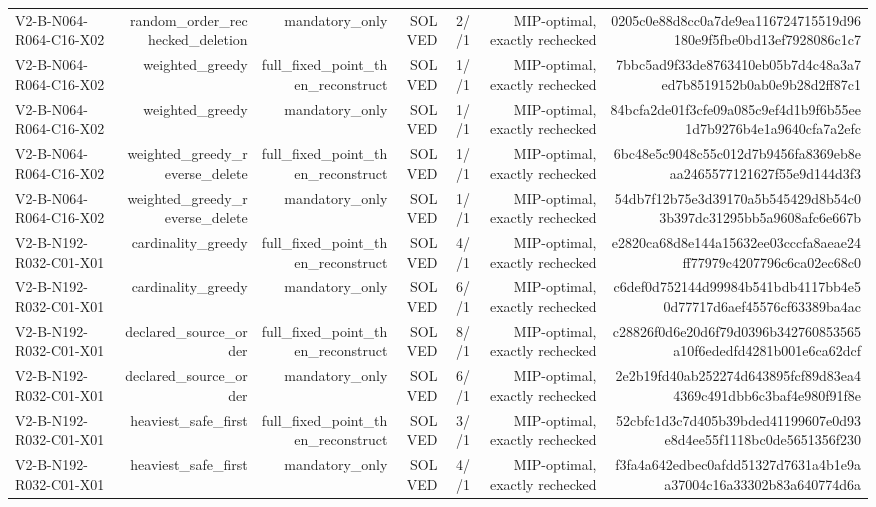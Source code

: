 {\begin{longtable}{lrrrrrr}
V2-B-N064-R064-C16-X02 & random\_order\_rechecked\_deletion & mandatory\_only & SOLVED & 2//1 & MIP-optimal, exactly rechecked & 0205c0e88d8cc0a7de9ea116724715519d96180e9f5fbe0bd13ef7928086c1c7 \\
V2-B-N064-R064-C16-X02 & weighted\_greedy & full\_fixed\_point\_then\_reconstruct & SOLVED & 1//1 & MIP-optimal, exactly rechecked & 7bbc5ad9f33de8763410eb05b7d4c48a3a7ed7b8519152b0ab0e9b28d2ff87c1 \\
V2-B-N064-R064-C16-X02 & weighted\_greedy & mandatory\_only & SOLVED & 1//1 & MIP-optimal, exactly rechecked & 84bcfa2de01f3cfe09a085c9ef4d1b9f6b55ee1d7b9276b4e1a9640cfa7a2efc \\
V2-B-N064-R064-C16-X02 & weighted\_greedy\_reverse\_delete & full\_fixed\_point\_then\_reconstruct & SOLVED & 1//1 & MIP-optimal, exactly rechecked & 6bc48e5c9048c55c012d7b9456fa8369eb8eaa2465577121627f55e9d144d3f3 \\
V2-B-N064-R064-C16-X02 & weighted\_greedy\_reverse\_delete & mandatory\_only & SOLVED & 1//1 & MIP-optimal, exactly rechecked & 54db7f12b75e3d39170a5b545429d8b54c03b397dc31295bb5a9608afc6e667b \\
V2-B-N192-R032-C01-X01 & cardinality\_greedy & full\_fixed\_point\_then\_reconstruct & SOLVED & 4//1 & MIP-optimal, exactly rechecked & e2820ca68d8e144a15632ee03cccfa8aeae24ff77979c4207796c6ca02ec68c0 \\
V2-B-N192-R032-C01-X01 & cardinality\_greedy & mandatory\_only & SOLVED & 6//1 & MIP-optimal, exactly rechecked & c6def0d752144d99984b541bdb4117bb4e50d77717d6aef45576cf63389ba4ac \\
V2-B-N192-R032-C01-X01 & declared\_source\_order & full\_fixed\_point\_then\_reconstruct & SOLVED & 8//1 & MIP-optimal, exactly rechecked & c28826f0d6e20d6f79d0396b342760853565a10f6ededfd4281b001e6ca62dcf \\
V2-B-N192-R032-C01-X01 & declared\_source\_order & mandatory\_only & SOLVED & 6//1 & MIP-optimal, exactly rechecked & 2e2b19fd40ab252274d643895fcf89d83ea44369c491dbb6c3baf4e980f91f8e \\
V2-B-N192-R032-C01-X01 & heaviest\_safe\_first & full\_fixed\_point\_then\_reconstruct & SOLVED & 3//1 & MIP-optimal, exactly rechecked & 52cbfc1d3c7d405b39bded41199607e0d93e8d4ee55f1118bc0de5651356f230 \\
V2-B-N192-R032-C01-X01 & heaviest\_safe\_first & mandatory\_only & SOLVED & 4//1 & MIP-optimal, exactly rechecked & f3fa4a642edbec0afdd51327d7631a4b1e9aa37004c16a33302b83a640774d6a \\

\end{longtable}}
